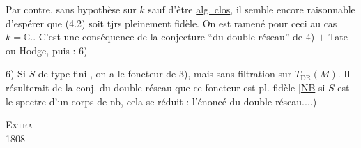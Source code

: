 Par contre, sans hypothèse sur $k$ sauf d'être \uline{alg. clos}, il semble encore raisonnable d'espérer que (4.2) soit tjrs pleinement fidèle.
On est ramené pour ceci au cas $k=\mathbb C$.. C'est une conséquence de la conjecture ``du double réseau'' de 4) $+$ Tate ou Hodge, puis : 6)

6) Si $S$ de type fini , on a le foncteur de 3), mais sans filtration sur $T_{\mathrm{DR}}(M)$. Il résulterait de la conj. du double réseau  que ce foncteur est pl. fidèle
[\uline{NB} si $S$ est le spectre d'un corps de nb, cela se réduit : l'énoncé du double réseau....)
\par\noindent\textsc{}\hfill\textsc{Extra}\\
 1808\hfill{}

